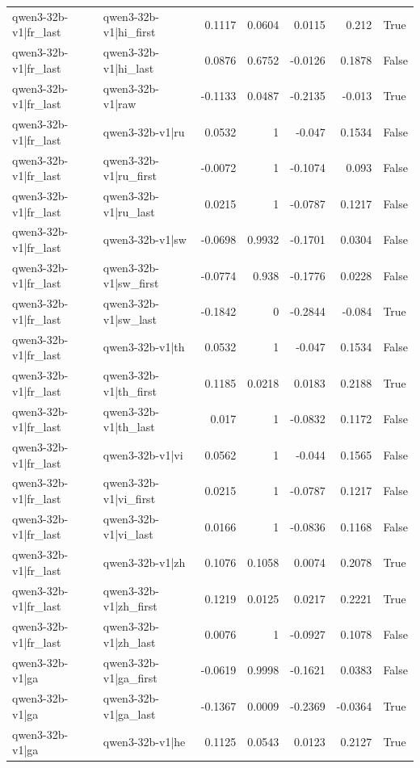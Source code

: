 \begin{table}
\begin{tabular}{l l r r r r l}
qwen3-32b-v1|fr_last & qwen3-32b-v1|hi_first & 0.1117 & 0.0604 & 0.0115 & 0.212 & True \\
qwen3-32b-v1|fr_last & qwen3-32b-v1|hi_last & 0.0876 & 0.6752 & -0.0126 & 0.1878 & False \\
qwen3-32b-v1|fr_last & qwen3-32b-v1|raw & -0.1133 & 0.0487 & -0.2135 & -0.013 & True \\
qwen3-32b-v1|fr_last & qwen3-32b-v1|ru & 0.0532 & 1 & -0.047 & 0.1534 & False \\
qwen3-32b-v1|fr_last & qwen3-32b-v1|ru_first & -0.0072 & 1 & -0.1074 & 0.093 & False \\
qwen3-32b-v1|fr_last & qwen3-32b-v1|ru_last & 0.0215 & 1 & -0.0787 & 0.1217 & False \\
qwen3-32b-v1|fr_last & qwen3-32b-v1|sw & -0.0698 & 0.9932 & -0.1701 & 0.0304 & False \\
qwen3-32b-v1|fr_last & qwen3-32b-v1|sw_first & -0.0774 & 0.938 & -0.1776 & 0.0228 & False \\
qwen3-32b-v1|fr_last & qwen3-32b-v1|sw_last & -0.1842 & 0 & -0.2844 & -0.084 & True \\
qwen3-32b-v1|fr_last & qwen3-32b-v1|th & 0.0532 & 1 & -0.047 & 0.1534 & False \\
qwen3-32b-v1|fr_last & qwen3-32b-v1|th_first & 0.1185 & 0.0218 & 0.0183 & 0.2188 & True \\
qwen3-32b-v1|fr_last & qwen3-32b-v1|th_last & 0.017 & 1 & -0.0832 & 0.1172 & False \\
qwen3-32b-v1|fr_last & qwen3-32b-v1|vi & 0.0562 & 1 & -0.044 & 0.1565 & False \\
qwen3-32b-v1|fr_last & qwen3-32b-v1|vi_first & 0.0215 & 1 & -0.0787 & 0.1217 & False \\
qwen3-32b-v1|fr_last & qwen3-32b-v1|vi_last & 0.0166 & 1 & -0.0836 & 0.1168 & False \\
qwen3-32b-v1|fr_last & qwen3-32b-v1|zh & 0.1076 & 0.1058 & 0.0074 & 0.2078 & True \\
qwen3-32b-v1|fr_last & qwen3-32b-v1|zh_first & 0.1219 & 0.0125 & 0.0217 & 0.2221 & True \\
qwen3-32b-v1|fr_last & qwen3-32b-v1|zh_last & 0.0076 & 1 & -0.0927 & 0.1078 & False \\
qwen3-32b-v1|ga & qwen3-32b-v1|ga_first & -0.0619 & 0.9998 & -0.1621 & 0.0383 & False \\
qwen3-32b-v1|ga & qwen3-32b-v1|ga_last & -0.1367 & 0.0009 & -0.2369 & -0.0364 & True \\
qwen3-32b-v1|ga & qwen3-32b-v1|he & 0.1125 & 0.0543 & 0.0123 & 0.2127 & True \\

\end{tabular}
\end{table}
